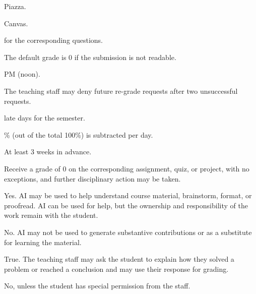 \documentclass{cisXXX} %
\date{Fall 2026}
\begin{document}
\maketitle

\HWproblem
\HWsubproblem
Piazza.

\HWsubproblem
Canvas.

 for the corresponding questions.

\HWsubproblem
The default grade is 0 if the submission is not readable.

\HWproblem
{} PM (noon).

\HWsubproblem
The teaching staff may deny future re-grade requests after two unsuccessful requests.

 late days for the semester.

\% (out of the total 100\%) is subtracted per day.

\HWsubproblem
At least 3 weeks in advance.

\HWproblem
\HWsubproblem
Receive a grade of 0 on the corresponding assignment, quiz, or project, with no exceptions, and further disciplinary action may be taken.

\HWsubproblem
Yes. AI may be used to help understand course material, brainstorm, format, or proofread. AI can be used for help, but the ownership and responsibility of the work remain with the student.

\HWsubproblem
No. AI may not be used to generate substantive contributions or as a substitute for learning the material.

\HWsubproblem
True. The teaching staff may ask the student to explain how they solved a problem or reached a conclusion and may use their response for grading.

\HWsubproblem
No, unless the student has special permission from the staff.
\end{document}
